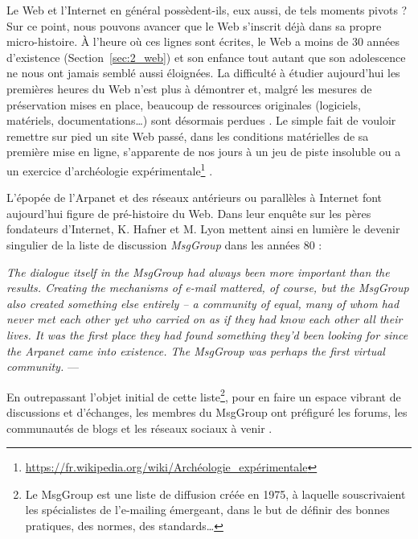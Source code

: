 \documentclass[symmetric,justified,marginals=raggedouter]{tufte-book}
\begin{document}
\noindent Le Web et l'Internet en général possèdent-ils, eux aussi, de tels moments pivots ? Sur ce point, nous pouvons avancer que le Web s'inscrit déjà dans sa propre micro-histoire. À l'heure où ces lignes sont écrites, le Web a moins de 30 années d'existence (Section~\ref{sec:2_web}) et son enfance tout autant que son adolescence ne nous ont jamais semblé aussi éloignées. La difficulté à étudier aujourd'hui les premières heures du Web n'est plus à démontrer \citep{gebeil_quand_2016} et, malgré les mesures de préservation mises en place, beaucoup de ressources originales (logiciels, matériels, documentations\ldots{}) sont désormais perdues \citep{helmond_historical_2017}. Le simple fait de vouloir remettre sur pied un site Web passé, dans les conditions matérielles de sa première mise en ligne, s'apparente de nos jours à un jeu de piste insoluble ou a un exercice d'archéologie expérimentale\footnote{\RaggedOuter \url{https://fr.wikipedia.org/wiki/Archéologie_expérimentale}} \citep{driscoll_searching_2017}. 

L'épopée de l'Arpanet \citep{russell_shadow_2014} et des réseaux antérieurs ou parallèles \citep{schafer_part_2015} à Internet font aujourd'hui figure de pré-histoire du Web. Dans leur enquête sur les pères fondateurs d'Internet, K. Hafner et M. Lyon mettent ainsi en lumière le devenir singulier de la liste de discussion \textit{MsgGroup} dans les années 80 :\\

\begin{fullwidth}
\og\textit{The dialogue itself in the MsgGroup had always been more important than the results. Creating the mechanisms of e-mail mattered, of course, but the MsgGroup also created something else entirely -- a community of equal, many of whom had never met each other yet who carried on as if they had know each other all their lives. It was the first place they had found something they'd been looking for since the Arpanet came into existence. The MsgGroup was perhaps the first virtual community.}\fg{} --- \citep[p.218]{hafner_where_1998}\\
\end{fullwidth} 

\noindent En outrepassant l'objet initial de cette liste\footnote{\RaggedOuter Le MsgGroup est une liste de diffusion créée en 1975, à laquelle souscrivaient les spécialistes de l'e-mailing émergeant, dans le but de définir des bonnes pratiques, des normes, des standards\ldots{}}, pour en faire un espace vibrant de discussions et d'échanges, les membres du MsgGroup ont préfiguré les forums, les communautés de blogs et les réseaux sociaux à venir \citep{stevenson_slashdot_2016,paloque-berges_quest-ce_2018}. 
\end{document}
